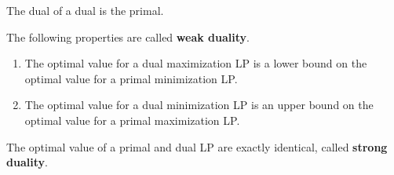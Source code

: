   \begin{theorem}
    The dual of a dual is the primal. 
  \end{theorem}

  \begin{theorem}
    The following properties are called \textbf{weak duality}. 
    \begin{enumerate}
      \item The optimal value for a dual maximization LP is a lower bound on the optimal value for a primal minimization LP. 
      \item The optimal value for a dual minimization LP is an upper bound on the optimal value for a primal maximization LP. 
    \end{enumerate}
  \end{theorem}

  \begin{theorem}
    The optimal value of a primal and dual LP are exactly identical, called \textbf{strong duality}. 
  \end{theorem}

